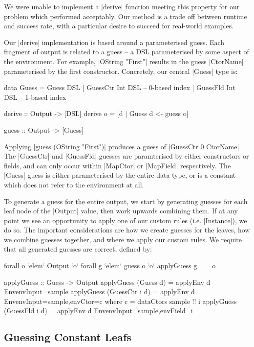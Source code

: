 \documentclass{llncs}
\begin{document}
We were unable to implement a |derive| function meeting this property for our problem which performed acceptably. Our method is a trade off between runtime and success rate, with a particular desire to succeed for real-world examples.

Our |derive| implementation is based around a parameterised guess. Each fragment of output is related to a guess -- a DSL parameterised by some aspect of the environment. For example, |OString "First"| results in the guess |CtorName| parameterised by the first constructor. Concretely, our central |Guess| type is:

\begin{code}
data Guess  =  Guess DSL
            |  GuessCtr Int DSL -- 0-based index
            |  GuessFld Int DSL -- 1-based index

derive :: Output -> [DSL]
derive o = [d | Guess d <- guess o]

guess :: Output -> [Guess]
\end{code}

Applying |guess (OString "First")| produces a guess of |GuessCtr 0 CtorName|. The |GuessCtr| and |GuessFld| guesses are paramterised by either constructors or fields, and can only occur within |MapCtor| or |MapField| respectively. The |Guess| guess is either parameterised by the entire data type, or is a constant which does not refer to the environment at all.

To generate a guess for the entire output, we start by generating guesses for each leaf node of the |Output| value, then work upwards combining them. If at any point we see an opportunity to apply one of our custom rules (i.e. |Instance|), we do so. The important considerations are how we create guesses for the leaves, how we combine guesses together, and where we apply our custom rules. We require that all generated guesses are correct, defined by:

\ignore\begin{code}
forall o `elem` Output `o` forall g `elem` guess o `o` applyGuess g == o
\end{code}
\begin{code}
applyGuess :: Guess -> Output
applyGuess (Guess       d) = applyEnv d Env{envInput=sample}
applyGuess (GuessCtr i  d) = applyEnv d Env{envInput=sample,envCtor=c}
    where c = dataCtors sample !! i
applyGuess (GuessFld i  d) = applyEnv d Env{envInput=sample,envField=i}
\end{code}

\subsection{Guessing Constant Leafs}
\end{document}
